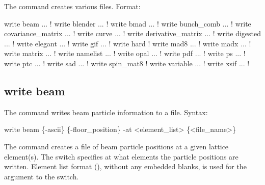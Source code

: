 {{{{{{{{{{{The  command creates various files.
Format:
\begin{example}
  write beam ...                  ! 
  write blender ...               ! 
  write bmad ...                  ! 
  write bunch_comb ...            ! 
  write covariance_matrix ...     ! 
  write curve ...                 ! 
  write derivative_matrix ...     ! 
  write digested ...              ! 
  write elegant ...               ! 
  write gif ...                   ! 
  write hard                      ! 
  write mad8 ...                  ! 
  write madx ...                  ! 
  write matrix ...                ! 
  write namelist ...              ! 
  write opal ...                  ! 
  write pdf ...                   !   
  write ps ...                    !   
  write ptc ...                   ! 
  write sad ...                   ! 
  write spin_mat8                 ! 
  write variable ...              ! 
  write xsif ...                  ! 
\end{example}



\subsection{write beam}
\label{s:write.beam}

The  command writes beam particle information to a file.
Syntax:
\begin{example}
    write beam \{-ascii\} \{-floor_position\} -at <element_list> \{<file_name>\} 
\end{example}

The  command creates a file of beam particle positions at a given lattice element(s). The
 switch specifies at what elements the particle positions are written. Element list format
(), without any embedded blanks, is used for the 
argument to the  switch. 

}}}}}}}}}}}
